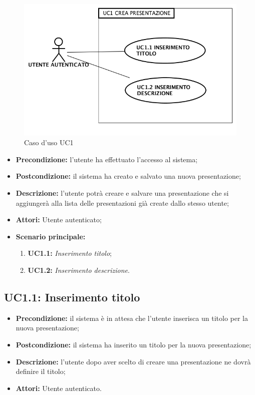 \begin{figure}[H]
	\begin{center}
	\includegraphics[scale=0.4]{diagram/UC1.png}
	\caption{Caso d'uso UC1}
	\end{center}
\end{figure}
\begin{itemize}
	\item \textbf{Precondizione:} l'utente ha effettuato l'accesso al sistema;
	\item \textbf{Postcondizione:} il sistema ha creato e salvato una nuova presentazione;
	\item \textbf{Descrizione:} l'utente potrà creare e salvare una presentazione che si aggiungerà alla lista delle presentazioni già create dallo stesso utente;
	\item \textbf{Attori:} Utente autenticato;
	\item \textbf{Scenario principale:}
	\begin{enumerate}
		\item \textbf{ UC1.1:} \textit{ Inserimento titolo};
		\item \textbf{ UC1.2:} \textit{ Inserimento descrizione}.
	\end{enumerate}
\end{itemize}
\subsection{ UC1.1: Inserimento titolo}

\begin{itemize}
	\item \textbf{Precondizione:} il sistema è in attesa che l'utente inserisca un titolo per la nuova presentazione;
	\item \textbf{Postcondizione:} il sistema ha inserito un titolo per la nuova presentazione;
	\item \textbf{Descrizione:} l'utente dopo aver scelto di creare una presentazione ne dovrà definire il titolo;
	\item \textbf{Attori:} Utente autenticato.
\end{itemize}
